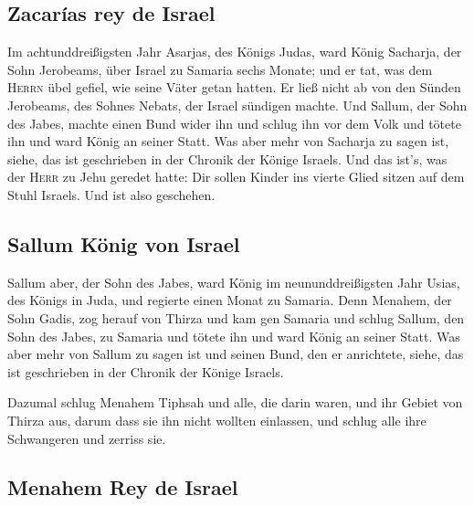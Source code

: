 \hypertarget{zacaruxedas-rey-de-israel}{%
\subsection{Zacarías rey de Israel}\label{zacaruxedas-rey-de-israel}}

 Im achtunddreißigsten Jahr Asarjas, des Königs Judas,
ward König Sacharja, der Sohn Jerobeams, über Israel zu Samaria sechs
Monate;  und er tat, was dem \textsc{Herrn} übel gefiel,
wie seine Väter getan hatten. Er ließ nicht ab von den Sünden Jerobeams,
des Sohnes Nebats, der Israel sündigen machte.  Und
Sallum, der Sohn des Jabes, machte einen Bund wider ihn und schlug ihn
vor dem Volk und tötete ihn und ward König an seiner Statt.
 Was aber mehr von Sacharja zu sagen ist, siehe, das ist
geschrieben in der Chronik der Könige Israels.  Und das
ist's, was der \textsc{Herr} zu Jehu geredet hatte: Dir sollen Kinder
ins vierte Glied sitzen auf dem Stuhl Israels. Und ist also geschehen.

\hypertarget{sallum-kuxf6nig-von-israel}{%
\subsection{Sallum König von Israel}\label{sallum-kuxf6nig-von-israel}}

 Sallum aber, der Sohn des Jabes, ward König im
neununddreißigsten Jahr Usias, des Königs in Juda, und regierte einen
Monat zu Samaria.  Denn Menahem, der Sohn Gadis, zog
herauf von Thirza und kam gen Samaria und schlug Sallum, den Sohn des
Jabes, zu Samaria und tötete ihn und ward König an seiner Statt.
 Was aber mehr von Sallum zu sagen ist und seinen Bund,
den er anrichtete, siehe, das ist geschrieben in der Chronik der Könige
Israels.

 Dazumal schlug Menahem Tiphsah und alle, die darin
waren, und ihr Gebiet von Thirza aus, darum dass sie ihn nicht wollten
einlassen, und schlug alle ihre Schwangeren und zerriss sie.

\hypertarget{menahem-rey-de-israel}{%
\subsection{Menahem Rey de Israel}\label{menahem-rey-de-israel}}


